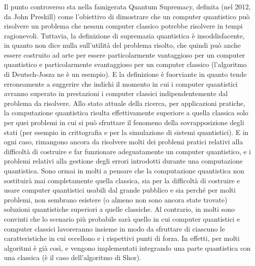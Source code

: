 \subsubsection{}
Il punto controverso sta nella famigerata Quantum Supremacy,
definita (nel 2012, da John Preskill) come l’obiettivo di dimostrare
che un computer quantistico può risolvere un problema che nessun
computer classico potrebbe risolvere in tempi ragionevoli.
Tuttavia, la definizione di supremazia quantistica è insoddisfacente, in
quanto non dice nulla sull’utilità del problema risolto, che quindi può
anche essere costruito ad arte per essere particolarmente vantaggioso
per un computer quantistico e particolarmente svantaggioso per un
computer classico (l’algoritmo di Deutsch-Josza ne è un esempio). E la definizione è fuorviante in quanto tende erroneamente a suggerire
che indichi il momento in cui i computer quantistici avranno superato
in prestazioni i computer classici indipendentemente dal problema da
risolvere. Allo stato attuale della ricerca, per applicazioni pratiche, la
computazione quantistica risulta effettivamente superiore a quella
classica solo per quei problemi in cui si può sfruttare il fenomeno
della sovrapposizione degli stati (per esempio in crittografia e per la
simulazione di sistemi quantistici). E in ogni caso, rimangono ancora da risolvere molti dei problemi
pratici relativi alla difficoltà di costruire e far funzionare
adeguatamente un computer quantistico, e i problemi relativi alla
gestione degli errori introdotti durante una computazione quantistica. Sono ormai in molti a pensare che la computazione quantistica non
sostituirà mai completamente quella classica, sia per la difficoltà di
costruire e usare computer quantistici usabili dal grande pubblico e
sia perché per molti problemi, non sembrano esistere (o almeno non
sono ancora state trovate) soluzioni quantistiche superiori a quelle
classiche. Al contrario, in molti sono convinti che lo scenario più probabile sarà
quello in cui computer quantistici e computer classici lavoreranno
insieme in modo da sfruttare di ciascuno le caratteristiche in cui
eccellono e i rispettivi punti di forza. In effetti, per molti algoritmi è
già così, e vengono implementati integrando una parte quantistica con
una classica (è il caso dell’algoritmo di Shor). 


